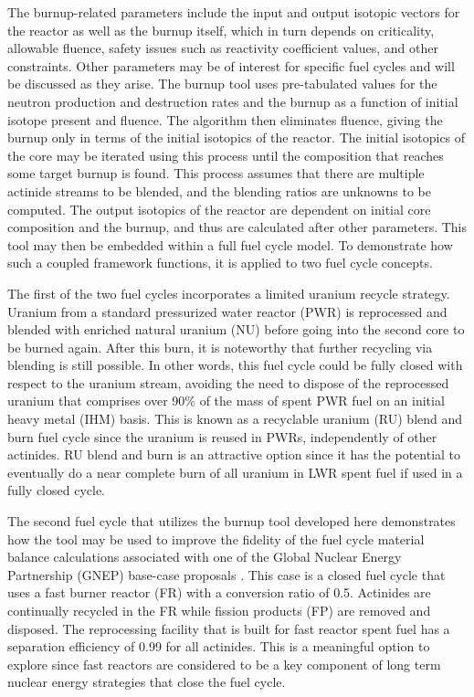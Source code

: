 The burnup-related parameters include the input and output isotopic vectors for the reactor 
as well as the burnup itself, which in turn depends on criticality, allowable fluence, safety issues 
such as reactivity coefficient values, and other constraints.  Other parameters may be of interest 
for specific fuel cycles and will be discussed as they arise.  The burnup tool uses pre-tabulated 
values for the neutron production and destruction rates and the burnup as a function of initial 
isotope present and fluence.  The algorithm then eliminates fluence, giving the burnup only in 
terms of the initial isotopics of the reactor.  The initial isotopics of the core may be iterated 
using this process until the composition that reaches some target burnup is found.  This process 
assumes that there are multiple actinide streams to be blended, and the blending ratios are unknowns 
to be computed.  The output isotopics of the reactor are dependent on initial core composition and 
the burnup, and thus are calculated after other parameters.   This tool may then be embedded within 
a full fuel cycle model.  To demonstrate how such a coupled framework functions, it is applied to 
two fuel cycle concepts.  

The first of the two fuel cycles incorporates a limited uranium recycle strategy.   Uranium from a 
standard pressurized water reactor (PWR) is reprocessed and blended with enriched natural uranium 
(NU) before going into the second core to be burned again.  After this burn, it is noteworthy that 
further recycling via blending is still possible.  In other words, this fuel cycle could be fully 
closed with respect to the uranium stream, avoiding the need to dispose of the reprocessed uranium 
that comprises over 90\% of the mass of spent PWR fuel on an initial heavy metal (IHM) basis.  
This is known as a recyclable uranium (RU) blend and burn fuel cycle since the uranium is reused 
in PWRs, independently of other actinides.  RU blend and burn is an attractive option since it has 
the potential to eventually do a near complete burn of all uranium in LWR spent fuel if used in a 
fully closed cycle.

The second fuel cycle that utilizes the burnup tool developed here demonstrates how the tool may 
be used to improve the fidelity of the fuel cycle material balance calculations associated with 
one of the Global Nuclear Energy Partnership (GNEP) base-case proposals \cite{PC-000555}.  This case is a 
closed fuel cycle that uses a fast burner reactor (FR) with a conversion ratio of 0.5.  
Actinides are continually recycled in the FR while fission products (FP) are removed and 
disposed.  The reprocessing facility that is built for fast reactor spent fuel has a separation 
efficiency of 0.99 for all actinides.  This is a meaningful option to explore since fast reactors 
are considered to be a key component of long term nuclear energy strategies that close the fuel cycle.

